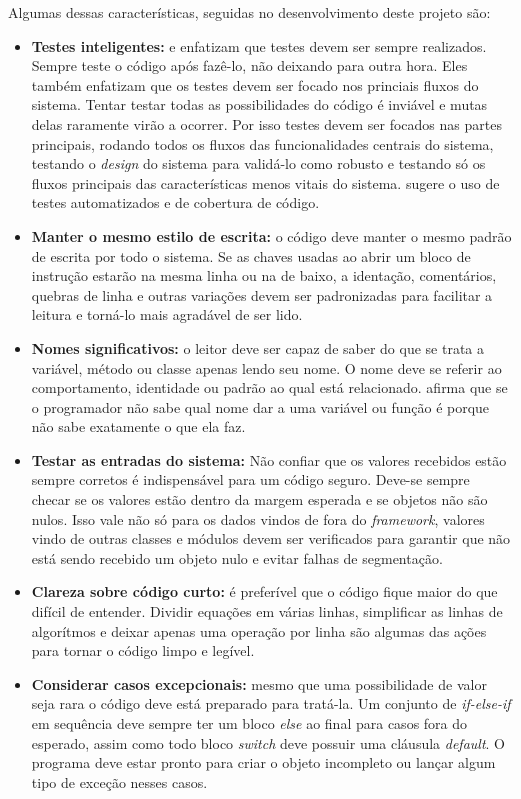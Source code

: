 Algumas dessas características, seguidas no desenvolvimento deste projeto são:

\begin{itemize}
  \item \textbf{Testes inteligentes:} \cite{Goodliffe2007} e \cite{McConnel2004} enfatizam que testes devem ser sempre realizados. Sempre teste o código após fazê-lo, não deixando para outra hora. Eles também enfatizam que os testes devem ser focado nos princiais fluxos do sistema. Tentar testar todas as possibilidades do código é inviável e mutas delas raramente virão a ocorrer. Por isso testes devem ser focados nas partes principais, rodando todos os fluxos das funcionalidades centrais do sistema, testando o \textit{design} do sistema para validá-lo como robusto e testando só os fluxos principais das características menos vitais do sistema. \cite{McConnel2004} sugere o uso de testes automatizados e de cobertura de código.
  \item \textbf{Manter o mesmo estilo de escrita:} o código deve manter o mesmo padrão de escrita por todo o sistema. Se as chaves usadas ao abrir um bloco de instrução estarão na mesma linha ou na de baixo, a identação, comentários, quebras de linha e outras variações devem ser padronizadas para facilitar a leitura e torná-lo mais agradável de ser lido.
  \item \textbf{Nomes significativos:} o leitor deve ser capaz de saber do que se trata a variável, método ou classe apenas lendo seu nome. O nome deve se referir ao comportamento, identidade ou padrão ao qual está relacionado. \cite{Goodliffe2007} afirma que se o programador não sabe qual nome dar a uma variável ou função é porque não sabe exatamente o que ela faz.
  \item \textbf{Testar as entradas do sistema:} Não confiar que os valores recebidos estão sempre corretos é indispensável para um código seguro. Deve-se sempre checar se os valores estão dentro da margem esperada e se objetos não são nulos. Isso vale não só para os dados vindos de fora do \textit{framework}, valores vindo de outras classes e módulos devem ser verificados para garantir que não está sendo recebido um objeto nulo e evitar falhas de segmentação.
  \item \textbf{Clareza sobre código curto:} é preferível que o código fique maior do que difícil de entender. Dividir equações em várias linhas, simplificar as linhas de algorítmos e deixar apenas uma operação por linha são algumas das ações para tornar o código limpo e legível.
  \item \textbf{Considerar casos excepcionais:} mesmo que uma possibilidade de valor seja rara o código deve está preparado para tratá-la. Um conjunto de \textit{if-else-if} em sequência deve sempre ter um bloco \textit{else} ao final para casos fora do esperado, assim como todo bloco \textit{switch} deve possuir uma cláusula \textit{default}. O programa deve estar pronto para criar o objeto incompleto ou lançar algum tipo de exceção nesses casos.

\end{itemize}
